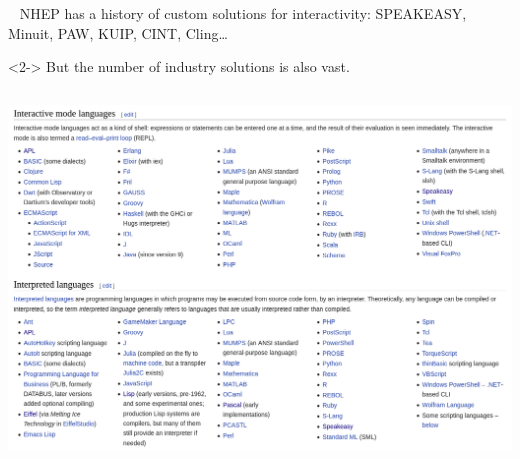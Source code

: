 \documentclass[aspectratio=169]{beamer}
\begin{document}
\begin{frame}{\mbox{ }}
\vspace{0.25 cm}
\Large
NHEP has a history of custom solutions for interactivity: SPEAKEASY, Minuit, PAW, KUIP, CINT, Cling\ldots

\vspace{0.5 cm}
\begin{uncoverenv}<2->
But the number of industry solutions is also vast.

\vspace{0.25 cm}
\begin{columns}
\includegraphics[width=\linewidth]{PLOTS/wikipedia-interpreted-languages.png}
\end{columns}
\end{uncoverenv}
\end{frame}
\end{document}
